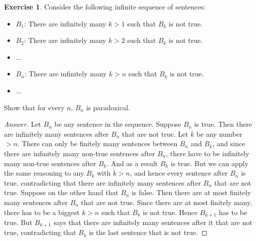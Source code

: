 \documentclass[11pt]{article}
\theoremstyle{definition}
\newtheorem{exer}{Exercise}
\begin{document}
\begin{exer}
Consider the following infinite sequence of sentences:
\begin{itemize}
    \item [] $B_1$: There are infinitely many $k > 1$ such that $B_k$ is not true.
    \item [] $B_2$: There are infinitely many $k > 2$ such that $B_k$ is not true.
    \item [] ...
    \item [] $B_n$: There are infinitely many $k > n$ such that $B_k$ is not true.
    \item [] ...
\end{itemize}
Show that for every $n$, $B_n$ is paradoxical.
\end{exer}

\begin{proof}[Answer]
Let $B_n$ be any sentence in the sequence. Suppose $B_n$ is true. Then there are infinitely many sentences after $B_n$ that are not true. Let $k$ be any number $> n$. There can only be finitely many sentences between $B_n$ and $B_k$, and since there are infinitely many non-true sentences after $B_n$, there have to be infinitely many non-true sentences after $B_k$. And as a result $B_k$ is true. But we can apply the same reasoning to any $B_k$ with $k > n$, and hence every sentence after $B_n$ is true, contradicting that there are infinitely many sentences after $B_n$ that are not true. Suppose on the other hand that $B_n$ is false. Then there are at most finitely many sentences after $B_n$ that are not true. Since there are at most finitely many, there has to be a biggest $k>n$ such that $B_k$ is not true. Hence $B_{k+1}$ has to be true. But $B_{k+1}$ says that there are infinitely many sentences after it that are not true, contradicting that $B_k$ is the last sentence that is not true.

\end{proof}
\end{document}
